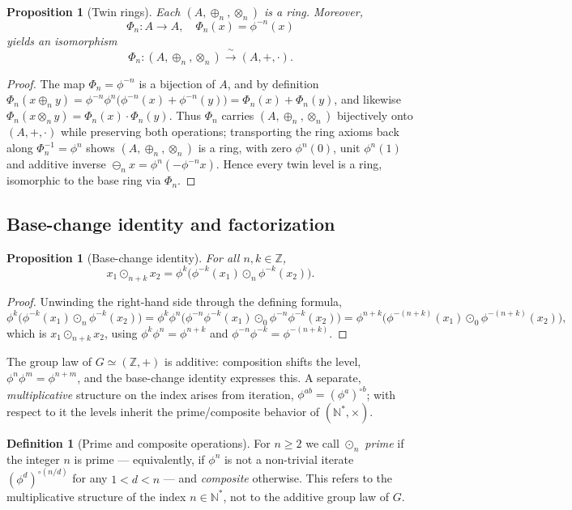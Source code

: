 \documentclass[11pt]{article}
\newtheorem{proposition}[theorem]{Proposition}
\theoremstyle{definition}
\newtheorem{definition}[theorem]{Definition}
\theoremstyle{remark}
\newcommand{\Z}{\mathbb{Z}}
\newcommand{\N}{\mathbb{N}}
\begin{document}
	\begin{proposition}[Twin rings]
		Each $(A,\oplus_n,\otimes_n)$ is a ring.
		Moreover,
		\[
		\Phi_n:A\to A,\quad \Phi_n(x)=\phi^{-n}(x)
		\]
		yields an isomorphism
		\[
		\Phi_n: (A,\oplus_n,\otimes_n)\xrightarrow{\ \sim\ }(A,+,\cdot).
		\]
	\end{proposition}
	\begin{proof}
		The map $\Phi_n=\phi^{-n}$ is a bijection of $A$, and by definition
		$\Phi_n(x\oplus_n y)=\phi^{-n}\phi^{n}\!\bigl(\phi^{-n}(x)+\phi^{-n}(y)\bigr)=\Phi_n(x)+\Phi_n(y)$,
		and likewise $\Phi_n(x\otimes_n y)=\Phi_n(x)\cdot\Phi_n(y)$. Thus $\Phi_n$ carries
		$(A,\oplus_n,\otimes_n)$ bijectively onto $(A,+,\cdot)$ while preserving both operations;
		transporting the ring axioms back along $\Phi_n^{-1}=\phi^{n}$ shows $(A,\oplus_n,\otimes_n)$
		is a ring, with zero $\phi^{n}(0)$, unit $\phi^{n}(1)$ and additive inverse
		$\ominus_n x=\phi^{n}(-\phi^{-n}x)$. Hence every twin level is a ring, isomorphic to the base
		ring via $\Phi_n$.
	\end{proof}
	
	\subsection{Base-change identity and factorization}
	
	\begin{proposition}[Base-change identity]
		For all $n,k\in\Z$,
		\[
		x_1\odot_{n+k}x_2
		=
		\phi^{k}\bigl(\phi^{-k}(x_1)\odot_n \phi^{-k}(x_2)\bigr).
		\]
	\end{proposition}
	\begin{proof}
		Unwinding the right-hand side through the defining formula,
		\[
			\phi^{k}\!\bigl(\phi^{-k}(x_1)\odot_n\phi^{-k}(x_2)\bigr)
			=\phi^{k}\phi^{n}\!\bigl(\phi^{-n}\phi^{-k}(x_1)\odot_0\phi^{-n}\phi^{-k}(x_2)\bigr)
			=\phi^{n+k}\!\bigl(\phi^{-(n+k)}(x_1)\odot_0\phi^{-(n+k)}(x_2)\bigr),
		\]
		which is $x_1\odot_{n+k}x_2$, using $\phi^{k}\phi^{n}=\phi^{n+k}$ and
		$\phi^{-n}\phi^{-k}=\phi^{-(n+k)}$.
	\end{proof}
	
The group law of $G\simeq(\Z,+)$ is additive: composition shifts the level,
$\phi^n\phi^m=\phi^{n+m}$, and the base-change identity expresses this. A separate,
\emph{multiplicative} structure on the index arises from iteration, $\phi^{ab}=(\phi^a)^{\circ b}$;
with respect to it the levels inherit the prime/composite behavior of $(\N^*,\times)$.
	
	\begin{definition}[Prime and composite operations]
		For $n\ge 2$ we call $\odot_n$ \emph{prime} if the integer $n$ is prime --- equivalently, if
		$\phi^n$ is not a non-trivial iterate $(\phi^d)^{\circ(n/d)}$ for any $1<d<n$ --- and
		\emph{composite} otherwise. This refers to the multiplicative structure of the index
		$n\in\N^*$, not to the additive group law of $G$.
	\end{definition}
	
\end{document}

